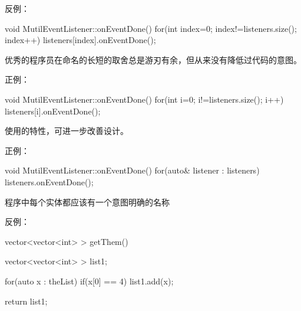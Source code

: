 \begin{content}
反例：
\begin{leftbar}
\begin{c++}[caption={\ttfamily{cub/trans-dsl/listener/MutilEventListener.cpp}}]
void MutilEventListener::onEventDone()
{
    for(int index=0; index!=listeners.size(); index++)
    {
        listeners[index].onEventDone();
    }
}
\end{c++}
\end{leftbar}

优秀的程序员在命名的长短的取舍总是游刃有余，但从来没有降低过代码的意图。

正例：
\begin{leftbar}
\begin{c++}[caption={\ttfamily{cub/trans-dsl/listener/MutilEventListener.cpp}}]
void MutilEventListener::onEventDone()
{
    for(int i=0; i!=listeners.size(); i++)
    {
        listeners[i].onEventDone();
    }
}
\end{c++}
\end{leftbar}

使用的特性，可进一步改善设计。

正例：
\begin{leftbar}
\begin{c++}[caption={\ttfamily{cub/trans-dsl/listener/MutilEventListener.cpp}}]
void MutilEventListener::onEventDone()
{
    for(auto& listener : listeners)
    {
        listeners.onEventDone();
    }
}
\end{c++}
\end{leftbar}


\begin{regulation}
程序中每个实体都应该有一个意图明确的名称
\end{regulation}

反例：
\begin{leftbar}
\begin{c++}[caption={\ttfamily{game/chess/GameBoard.h}}]
vector<vector<int> > getThem() 
{
    vector<vector<int> > list1;
    
    for(auto x : theList)
    {
        if(x[0] == 4)
        {   
            list1.add(x);
        }
    }
    
    return list1;
}
\end{c++}
\end{leftbar}

\begin{enum}
\end{enum}


\end{content}
